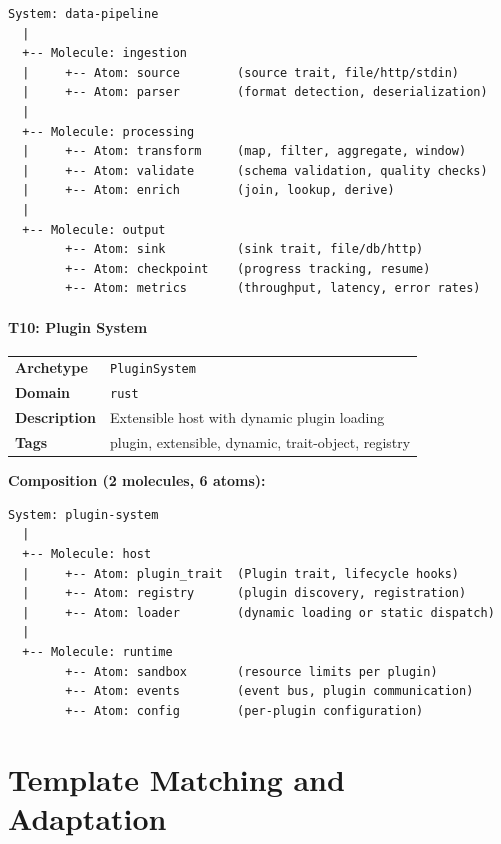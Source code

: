 \documentclass[11pt,a4paper,twoside]{article}
\theoremstyle{definition}
\theoremstyle{plain}
\theoremstyle{remark}
\begin{document}
\begin{lstlisting}
System: data-pipeline
  |
  +-- Molecule: ingestion
  |     +-- Atom: source        (source trait, file/http/stdin)
  |     +-- Atom: parser        (format detection, deserialization)
  |
  +-- Molecule: processing
  |     +-- Atom: transform     (map, filter, aggregate, window)
  |     +-- Atom: validate      (schema validation, quality checks)
  |     +-- Atom: enrich        (join, lookup, derive)
  |
  +-- Molecule: output
        +-- Atom: sink          (sink trait, file/db/http)
        +-- Atom: checkpoint    (progress tracking, resume)
        +-- Atom: metrics       (throughput, latency, error rates)
\end{lstlisting}

\subsection{T10: Plugin System}\label{sec:t10}

\begin{tabularx}{\textwidth}{l X}
\toprule
\textbf{Archetype} & \texttt{PluginSystem} \\
\textbf{Domain} & \texttt{rust} \\
\textbf{Description} & Extensible host with dynamic plugin loading \\
\textbf{Tags} & plugin, extensible, dynamic, trait-object, registry \\
\bottomrule
\end{tabularx}

\medskip\noindent\textbf{Composition (2 molecules, 6 atoms):}

\begin{lstlisting}
System: plugin-system
  |
  +-- Molecule: host
  |     +-- Atom: plugin_trait  (Plugin trait, lifecycle hooks)
  |     +-- Atom: registry      (plugin discovery, registration)
  |     +-- Atom: loader        (dynamic loading or static dispatch)
  |
  +-- Molecule: runtime
        +-- Atom: sandbox       (resource limits per plugin)
        +-- Atom: events        (event bus, plugin communication)
        +-- Atom: config        (per-plugin configuration)
\end{lstlisting}


\part{Template Matching and Adaptation}\label{part:matching}
\end{document}
